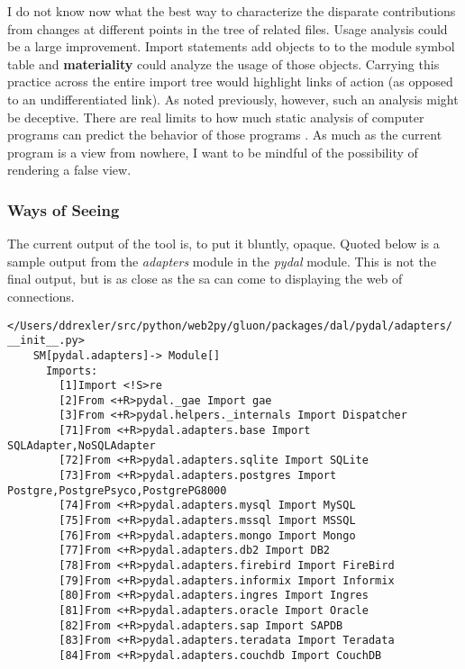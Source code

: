 \documentclass[a4paper,man,natbib,floatsintext]{apa6}
\begin{document}
  I do not know now what the best way to characterize the disparate contributions from changes at different points in the tree of related files. Usage analysis could be a large improvement. Import statements add objects to to the module symbol table and \textbf{materiality} could analyze the usage of those objects. Carrying this practice across the entire import tree would highlight links of action (as opposed to an undifferentiated link). As noted previously, however, such an analysis might be deceptive. There are real limits to how much static analysis of computer programs can predict the behavior of those programs \citet{Kaplan_undated-xy}. As much as the current program is a view from nowhere, I want to be mindful of the possibility of rendering a false view.

  \subsubsection{Ways of Seeing}
  The current output of the tool is, to put it bluntly, opaque. Quoted below is a sample output from the \textit{adapters} module in the \textit{pydal} module. This is not the final output, but is as close as the \gls{sa} can come to displaying the web of connections. 

  \singlespace
  \begin{Verbatim}[fontsize=\small]
    </Users/ddrexler/src/python/web2py/gluon/packages/dal/pydal/adapters/ __init__.py>
    SM[pydal.adapters]-> Module[]
      Imports:
        [1]Import <!S>re
        [2]From <+R>pydal._gae Import gae
        [3]From <+R>pydal.helpers._internals Import Dispatcher
        [71]From <+R>pydal.adapters.base Import SQLAdapter,NoSQLAdapter
        [72]From <+R>pydal.adapters.sqlite Import SQLite
        [73]From <+R>pydal.adapters.postgres Import Postgre,PostgrePsyco,PostgrePG8000
        [74]From <+R>pydal.adapters.mysql Import MySQL
        [75]From <+R>pydal.adapters.mssql Import MSSQL
        [76]From <+R>pydal.adapters.mongo Import Mongo
        [77]From <+R>pydal.adapters.db2 Import DB2
        [78]From <+R>pydal.adapters.firebird Import FireBird
        [79]From <+R>pydal.adapters.informix Import Informix
        [80]From <+R>pydal.adapters.ingres Import Ingres
        [81]From <+R>pydal.adapters.oracle Import Oracle
        [82]From <+R>pydal.adapters.sap Import SAPDB
        [83]From <+R>pydal.adapters.teradata Import Teradata
        [84]From <+R>pydal.adapters.couchdb Import CouchDB
  \end{Verbatim}
  \doublespace
\end{document}
